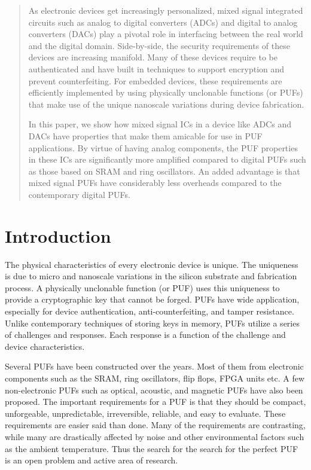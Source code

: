 \begin{abstract}
As electronic devices get increasingly personalized,
mixed signal integrated circuits such as analog to digital converters (ADCs)
and digital to analog converters (DACs) play a pivotal role in interfacing 
between the real world and the digital domain. Side-by-side, the security
requirements of these devices are increasing manifold. Many of these devices
require to be authenticated and have built in techniques to support 
encryption and prevent counterfeiting. For embedded devices, 
these requirements are efficiently implemented by 
using physically unclonable functions (or PUFs) that make use of the 
unique nanoscale variations during device fabrication.

In this paper, we show how mixed signal ICs in a device like ADCs and DACs 
have properties that make them amicable for use in PUF applications. By
virtue of having analog components, the PUF properties in these ICs
are significantly more amplified compared to digital PUFs such as those based on
SRAM and ring oscillators. An added advantage is that mixed signal PUFs
have considerably less overheads compared to the contemporary digital PUFs. 
\end{abstract}

\section{Introduction}
The physical characteristics of every electronic device is unique.
The uniqueness is due to micro and nanoscale variations in the 
silicon substrate and fabrication process. A physically unclonable function 
(or PUF) uses this uniqueness to provide a cryptographic key that 
cannot be forged. PUFs have wide application, especially for device
authentication, anti-counterfeiting, and tamper resistance.
Unlike contemporary techniques of storing keys in memory,
PUFs utilize a series of challenges and responses. Each response is a 
function of the challenge and device characteristics. 

Several PUFs have been constructed over the years. Most of them
from electronic components such as the SRAM, ring oscillators, flip flops,
FPGA units etc. A few non-electronic PUFs such as optical, acoustic,
and magnetic PUFs have also been proposed. The important requirements
for a PUF is that they should be compact, unforgeable, unpredictable, irreversible, 
reliable, and easy to evaluate. These requirements are easier said than done.
Many of the requirements are contrasting, while many are drastically affected
by noise and other environmental factors such as the ambient temperature.
Thus the search for the search for the perfect PUF is an open problem
and active area of research.



